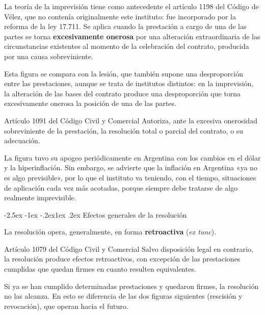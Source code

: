 \documentclass[12pt,oneside]{book}
\makeatletter
\renewcommand\subsection{\@startsection{subsection}{2}{\z@}%
  {-2.5ex \@plus -1ex \@minus -.2ex}{1ex \@plus .2ex}%
  {\normalfont\normalsize\bfseries}}
\makeatother
\begin{document}
La teoría de la imprevisión tiene como antecedente el artículo 1198 del Código de Vélez, que no contenía originalmente este instituto: fue incorporado por la reforma de la ley 17.711. Se aplica cuando la prestación a cargo de una de las partes se torna \textbf{excesivamente onerosa} por una alteración extraordinaria de las circunstancias existentes al momento de la celebración del contrato, producida por una causa sobreviniente.

Esta figura se compara con la lesión, que también supone una desproporción entre las prestaciones, aunque se trata de institutos distintos: en la imprevisión, la alteración de las bases del contrato produce una desproporción que torna excesivamente onerosa la posición de una de las partes.

\begin{articulo}{Artículo 1091 del Código Civil y Comercial}
Autoriza, ante la excesiva onerosidad sobreviniente de la prestación, la resolución total o parcial del contrato, o su adecuación.
\end{articulo}

\begin{nota}
La figura tuvo su apogeo periódicamente en Argentina con los cambios en el dólar y la hiperinflación. Sin embargo, se advierte que la inflación en Argentina «ya no es algo previsible», por lo que el instituto va teniendo, con el tiempo, situaciones de aplicación cada vez más acotadas, porque siempre debe tratarse de algo realmente imprevisible.
\end{nota}

\subsection{Efectos generales de la resolución}

La resolución opera, generalmente, en forma \textbf{retroactiva} (\textit{ex tunc}).

\begin{articulo}{Artículo 1079 del Código Civil y Comercial}
Salvo disposición legal en contrario, la resolución produce efectos retroactivos, con excepción de las prestaciones cumplidas que quedan firmes en cuanto resulten equivalentes.
\end{articulo}

Si ya se han cumplido determinadas prestaciones y quedaron firmes, la resolución no las alcanza. En esto se diferencia de las dos figuras siguientes (rescisión y revocación), que operan hacia el futuro.
\end{document}
